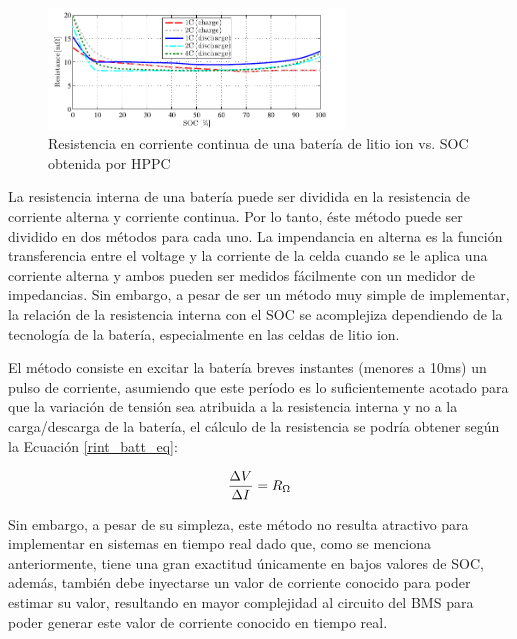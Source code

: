 \documentclass[10pt,a4paper]{article}
\begin{document}
\begin{figure}[h]
    \begin{center}
	\includegraphics[width=0.7\textwidth]{Ro_vs_SOC.png}
	\caption{Resistencia en corriente continua de una batería de litio ion vs. 
        SOC obtenida por HPPC}
	\label{res_int_graph}
    \end{center}
\end{figure}

\noindent La resistencia interna de una bater\'ia puede ser dividida en la
resistencia de corriente alterna y corriente continua. Por lo tanto,
\'este m\'etodo puede ser dividido en dos m\'etodos para cada uno. 
La impendancia en alterna es la funci\'on transferencia entre el
voltage y la corriente de la celda cuando se le aplica una corriente
alterna y ambos pueden ser medidos f\'acilmente con un medidor de impedancias. 
Sin embargo, a pesar de ser un m\'etodo muy simple de implementar, la relaci\'on 
de la resistencia interna con el SOC se acomplejiza dependiendo de la 
tecnolog\'ia de la bater\'ia, especialmente en las celdas de litio ion.

\noindent El m\'etodo consiste en excitar la bater\'ia breves instantes 
(menores a 10ms) un pulso de corriente, asumiendo que este per\'iodo es lo 
suficientemente acotado para que la variaci\'on de tensi\'on sea atribuida a la 
resistencia interna y no a la carga/descarga de la bater\'ia, el c\'alculo de la 
resistencia se podr\'ia obtener seg\'un la Ecuaci\'on
\ref{rint_batt_eq}:

\begin{equation}
    \frac{\Delta V}{\Delta I} = R_{\ohm} \label{rint_batt_eq}
\end{equation}

Sin embargo, a pesar de su simpleza, este m\'etodo no resulta atractivo para
implementar en sistemas en tiempo real dado que, como se menciona anteriormente,
tiene una gran exactitud \'unicamente en bajos valores de \acrshort{SOC},
adem\'as, tambi\'en debe inyectarse un valor de corriente conocido para poder
estimar su valor, resultando en mayor complejidad al circuito del \acrshort{BMS}
para poder generar este valor de corriente conocido en tiempo real.
\end{document}

